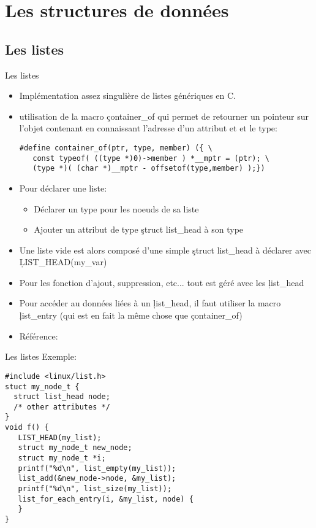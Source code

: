 \section{Les structures de données}

\subsection{Les listes}

\begin{frame}[fragile=singleslide]{Les listes}
  \begin{itemize}
  \item Implémentation assez singulière de listes génériques en C.
  \item  utilisation  de  la  macro  \c{container_of}  qui  permet  de
    retourner  un  pointeur   sur  l'objet  contenant  en  connaissant
    l'adresse d'un attribut et et le type:
    \begin{lstlisting}
#define container_of(ptr, type, member) ({ \
   const typeof( ((type *)0)->member ) *__mptr = (ptr); \
   (type *)( (char *)__mptr - offsetof(type,member) );})
    \end{lstlisting}
  \item Pour déclarer une liste:
    \begin{itemize}
    \item Déclarer un type pour les noeuds de sa liste
    \item Ajouter un attribut de type \c{struct list_head} à son type
    \end{itemize}
  \item   Une   liste   vide    est   alors   composé   d'une   simple
    \c{struct list_head} à déclarer avec \c{LIST_HEAD(my_var)}
  \item Pour  les fonction d'ajout, suppression, etc...  tout est géré
    avec les \c{list_head}
  \item  Pour accéder  au données  liées à  un \c{list_head},  il faut
    utiliser la  macro \c{list_entry} (qui  est en fait la  même chose
    que \c{container_of})
  \item Référence: \file{linux/list.h}
  \end{itemize}
\end{frame}

\begin{frame}[fragile=singleslide]{Les listes}
  Exemple:
  \begin{lstlisting}
#include <linux/list.h>
stuct my_node_t {
  struct list_head node;
  /* other attributes */
}
void f() {
   LIST_HEAD(my_list);
   struct my_node_t new_node;
   struct my_node_t *i;
   printf("%d\n", list_empty(my_list));
   list_add(&new_node->node, &my_list);
   printf("%d\n", list_size(my_list));
   list_for_each_entry(i, &my_list, node) {
   }
}
  \end{lstlisting}
\end{frame}

